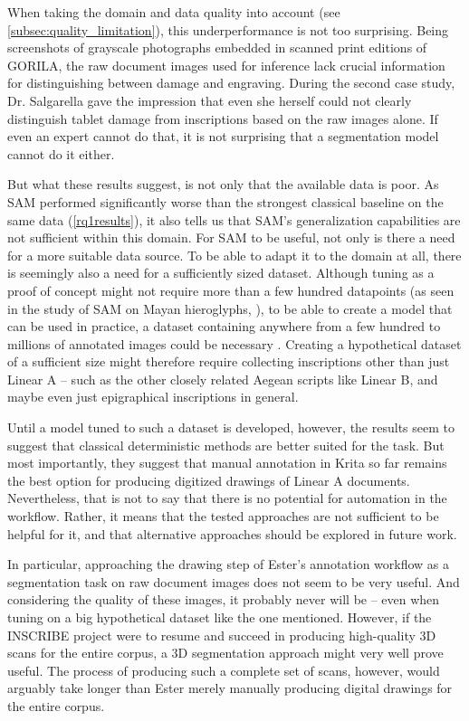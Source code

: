 When taking the domain and data quality into account (see \cref{subsec:quality_limitation}), this underperformance is not too surprising.
Being screenshots of grayscale photographs embedded in scanned print editions of \acs{GORILA}, the raw document images used for inference lack crucial information for distinguishing between damage and engraving.
During the second case study, Dr. Salgarella gave the impression that even she herself could not clearly distinguish tablet damage from inscriptions based on the raw images alone.
If even an expert cannot do that, it is not surprising that a segmentation model cannot do it either.

But what these results suggest, is not only that the available data is poor.
As \acs{SAM} performed significantly worse than the strongest classical baseline on the same data (\cref{rq1results}), it also tells us that \acs{SAM}'s generalization capabilities are not sufficient within this domain.
For \acs{SAM} to be useful, not only is there a need for a more suitable data source.
To be able to adapt it to the domain at all, there is seemingly also a need for a sufficiently sized dataset.
Although tuning as a proof of concept might not require more than a few hundred datapoints (as seen in the study of \acs{SAM} on Mayan hieroglyphs, \parencite{MayaSAM}), to be able to create a model that can be used in practice, a dataset containing anywhere from a few hundred to millions of annotated images could be necessary \parencite[p.~2]{ontuningdataset}.
Creating a hypothetical dataset of a sufficient size might therefore require collecting inscriptions other than just Linear A -- such as the other closely related Aegean scripts like Linear B, and maybe even just epigraphical inscriptions in general.

Until a model tuned to such a dataset is developed, however, the results seem to suggest that classical deterministic methods are better suited for the task.
But most importantly, they suggest that manual annotation in Krita so far remains the best option for producing digitized drawings of Linear A documents.
Nevertheless, that is not to say that there is no potential for automation in the workflow.
Rather, it means that the tested approaches are not sufficient to be helpful for it, and that alternative approaches should be explored in future work.

In particular, approaching the drawing step of Ester's annotation workflow as a segmentation task on raw document images does not seem to be very useful.
And considering the quality of these images, it probably never will be -- even when tuning on a big hypothetical dataset like the one mentioned.
However, if the INSCRIBE \parencite{INSCRIBE3D} project were to resume and succeed in producing high-quality 3D scans for the entire corpus, a 3D segmentation approach might very well prove useful.
The process of producing such a complete set of scans, however, would arguably take longer than Ester merely manually producing digital drawings for the entire corpus.

